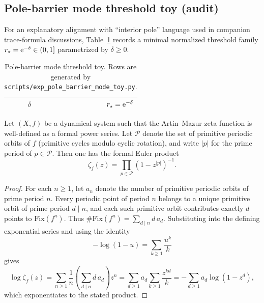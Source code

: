 \subsection{Pole-barrier mode threshold toy (audit)}
\label{subsec:pole_barrier_mode_toy}

\AuditTag For an explanatory alignment with ``interior pole'' language used in companion trace-formula discussions, Table~\ref{tab:pole_barrier_mode_toy} records a minimal normalized threshold family
\(
r_\star=\mathrm{e}^{-\delta}\in(0,1]
\)
parametrized by $\delta\ge 0$.

\begin{table}[H]
\centering
\scriptsize
\setlength{\tabcolsep}{10pt}
\renewcommand{\arraystretch}{1.15}
\begin{tabular}{rr}
\toprule
$\delta$ & $r_\star=\mathrm{e}^{-\delta}$ \\
\midrule
%
\end{tabular}
\caption{Pole-barrier mode threshold toy. Rows are generated by \texttt{scripts/exp\_pole\_barrier\_mode\_toy.py}.}
\label{tab:pole_barrier_mode_toy}
\end{table}

\begin{lemma}
\label{lem:artin_mazur_euler_product}
\MathTag Let $(X,f)$ be a dynamical system such that the Artin--Mazur zeta function is well-defined as a formal power series.
Let $\mathcal{P}$ denote the set of primitive periodic orbits of $f$ (primitive cycles modulo cyclic rotation), and write $|p|$ for the prime period of $p\in\mathcal{P}$.
Then one has the formal Euler product
\[
\zeta_f(z)=\prod_{p\in\mathcal{P}}\left(1-z^{|p|}\right)^{-1}.
\]
\end{lemma}
\begin{proof}
For each $n\ge 1$, let $a_n$ denote the number of primitive periodic orbits of prime period $n$.
Every periodic point of period $n$ belongs to a unique primitive orbit of prime period $d\mid n$, and each such primitive orbit contributes exactly $d$ points to $\mathrm{Fix}(f^n)$.
Thus $\#\mathrm{Fix}(f^n)=\sum_{d\mid n} d\,a_d$.
Substituting into the defining exponential series and using the identity
\[
-\log(1-u)=\sum_{k\ge 1}\frac{u^k}{k}
\]
gives
\[
\log \zeta_f(z)=\sum_{n\ge 1}\frac{1}{n}\left(\sum_{d\mid n} d\,a_d\right)z^n
=\sum_{d\ge 1}a_d\sum_{k\ge 1}\frac{z^{kd}}{k}
=-\sum_{d\ge 1}a_d\log(1-z^d),
\]
which exponentiates to the stated product.
\end{proof}


